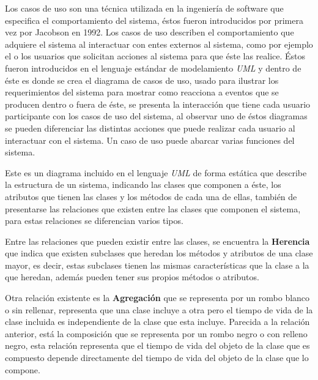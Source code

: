 \documentclass{memoria}
\begin{document}


Los casos de uso son una técnica utilizada en la ingeniería de software que especifica el comportamiento del sistema, éstos fueron introducidos por primera vez por Jacobson en 1992. Los casos de uso describen el comportamiento que adquiere el sistema al interactuar con entes externos al sistema, como por ejemplo el o los usuarios que solicitan acciones al sistema para que éste las realice. Éstos fueron introducidos en el lenguaje estándar de modelamiento \textsl{UML} y dentro de éste es donde se crea el diagrama de casos de uso, usado para ilustrar los requerimientos del sistema para mostrar como reacciona a eventos que se producen dentro o fuera de éste, se presenta la interacción que tiene cada usuario participante con los casos de uso del sistema, al observar uno de éstos diagramas se pueden diferenciar las distintas acciones que puede realizar cada usuario al interactuar con el sistema. Un caso de uso puede abarcar varias funciones del sistema.


Este es un diagrama incluido en el lenguaje \textsl{UML} de forma estática que describe la estructura de un sistema, indicando las clases que componen a éste, los atributos que tienen las clases y los métodos de cada una de ellas, también de presentarse las relaciones que existen entre las clases que componen el sistema, para estas relaciones se diferencian varios tipos.

Entre las relaciones que pueden existir entre las clases, se encuentra la \textbf{Herencia} que indica que existen subclases que heredan los métodos y atributos de una clase mayor, es decir, estas subclases tienen las mismas características que la clase a la que heredan, además pueden tener sus propios métodos o atributos. 

Otra relación existente es la \textbf{Agregación} que se representa por un rombo blanco o sin rellenar, representa que una clase incluye a otra pero el tiempo de vida de la clase incluida es independiente de la clase que esta incluye. Parecida a la relación anterior, está la composición que se representa por un rombo negro o con relleno negro, esta relación representa que el tiempo de vida del objeto de la clase que es compuesto depende directamente del tiempo de vida del objeto de la clase que lo compone. 
\end{document}
